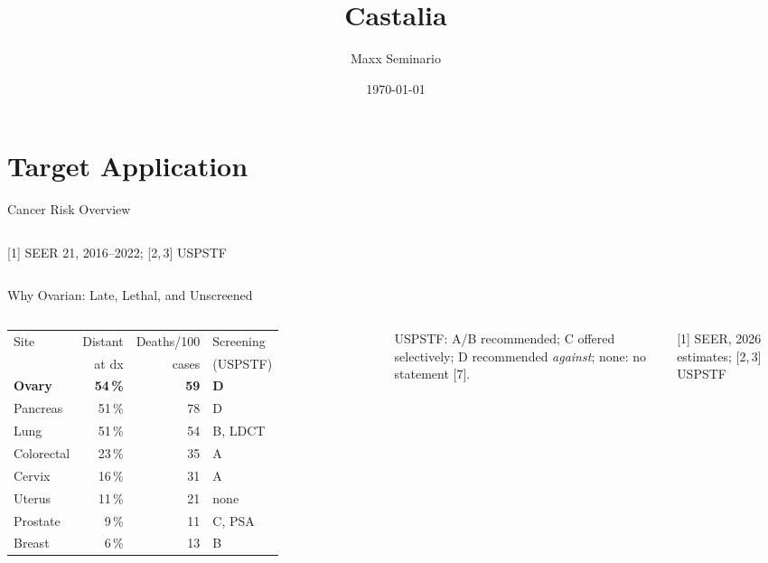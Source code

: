 \documentclass[10pt, aspectratio=169]{beamer}
\title[Castalia]{Castalia}
\author{Maxx Seminario}
\institute{University of Nebraska--Lincoln}
\date{\today}
\begin{document}
\begin{frame}
  \titlepage
\end{frame}

\section{Target Application}


\begin{frame}[t]{Cancer Risk Overview}
\begin{columns}[T]
\vspace{0.05cm}
\cancerhighlightfalse
\resizebox{\linewidth}{!}{}
\vspace{0.3cm}
{\scriptsize [1] SEER 21, 2016--2022; [2,\,3] USPSTF}
\end{columns}
\end{frame}

\begin{frame}[t]{Why Ovarian: Late, Lethal, and Unscreened}
\begin{columns}[T]
\vspace{0.05cm}
\cancerhighlighttrue
\resizebox{\linewidth}{!}{}
\vspace{0.3cm}
{\scriptsize
\begin{tabular}{@{}lrrl@{}}
\toprule
Site & Distant & Deaths/100 & Screening \\
     & at dx   & cases      & (USPSTF) \\
\midrule
\textbf{Ovary} & \textbf{54\,\%} & \textbf{59} & \textbf{D} \\
Pancreas   & 51\,\% & 78 & D \\
Lung       & 51\,\% & 54 & B, LDCT \\
Colorectal & 23\,\% & 35 & A \\
Cervix     & 16\,\% & 31 & A \\
Uterus     & 11\,\% & 21 & none \\
Prostate   &  9\,\% & 11 & C, PSA \\
Breast     &  6\,\% & 13 & B \\
\bottomrule
\end{tabular}}
\vspace{0.15cm}

{\scriptsize USPSTF: A/B recommended; C offered selectively; D recommended \emph{against}; none: no statement [7].}
\vspace{0.1cm}

{\scriptsize [1] SEER, 2026 estimates; [2,\,3] USPSTF}
\end{columns}
\end{frame}
\end{document}
